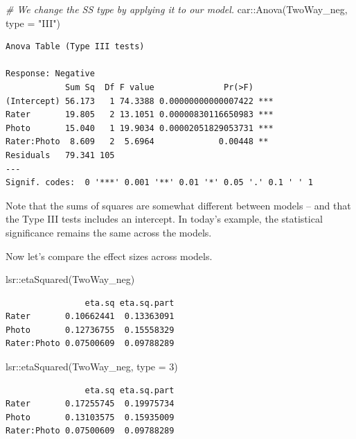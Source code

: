 \documentclass[
  11pt,
]{book}
\newenvironment{Shaded}{\begin{snugshade}}{\end{snugshade}}
\newcommand{\AttributeTok}[1]{\textcolor[rgb]{0.77,0.63,0.00}{#1}}
\newcommand{\CommentTok}[1]{\textcolor[rgb]{0.56,0.35,0.01}{\textit{#1}}}
\newcommand{\DecValTok}[1]{\textcolor[rgb]{0.00,0.00,0.81}{#1}}
\newcommand{\FunctionTok}[1]{\textcolor[rgb]{0.00,0.00,0.00}{#1}}
\newcommand{\NormalTok}[1]{#1}
\newcommand{\SpecialCharTok}[1]{\textcolor[rgb]{0.00,0.00,0.00}{#1}}
\newcommand{\StringTok}[1]{\textcolor[rgb]{0.31,0.60,0.02}{#1}}
\begin{document}
\begin{Shaded}
\begin{Highlighting}[]
\CommentTok{\# We change the SS type by applying it to our model.}
\NormalTok{car}\SpecialCharTok{::}\FunctionTok{Anova}\NormalTok{(TwoWay\_neg, }\AttributeTok{type =} \StringTok{"III"}\NormalTok{)}
\end{Highlighting}
\end{Shaded}

\begin{verbatim}
Anova Table (Type III tests)

Response: Negative
            Sum Sq  Df F value              Pr(>F)    
(Intercept) 56.173   1 74.3388 0.00000000000007422 ***
Rater       19.805   2 13.1051 0.00000830116650983 ***
Photo       15.040   1 19.9034 0.00002051829053731 ***
Rater:Photo  8.609   2  5.6964             0.00448 ** 
Residuals   79.341 105                                
---
Signif. codes:  0 '***' 0.001 '**' 0.01 '*' 0.05 '.' 0.1 ' ' 1
\end{verbatim}

Note that the sums of squares are somewhat different between models -- and that the Type III tests includes an intercept. In today's example, the statistical significance remains the same across the models.

Now let's compare the effect sizes across models.

\begin{Shaded}
\begin{Highlighting}[]
\NormalTok{lsr}\SpecialCharTok{::}\FunctionTok{etaSquared}\NormalTok{(TwoWay\_neg)}
\end{Highlighting}
\end{Shaded}

\begin{verbatim}
                eta.sq eta.sq.part
Rater       0.10662441  0.13363091
Photo       0.12736755  0.15558329
Rater:Photo 0.07500609  0.09788289
\end{verbatim}

\begin{Shaded}
\begin{Highlighting}[]
\NormalTok{lsr}\SpecialCharTok{::}\FunctionTok{etaSquared}\NormalTok{(TwoWay\_neg, }\AttributeTok{type =} \DecValTok{3}\NormalTok{)}
\end{Highlighting}
\end{Shaded}

\begin{verbatim}
                eta.sq eta.sq.part
Rater       0.17255745  0.19975734
Photo       0.13103575  0.15935009
Rater:Photo 0.07500609  0.09788289
\end{verbatim}
\end{document}

